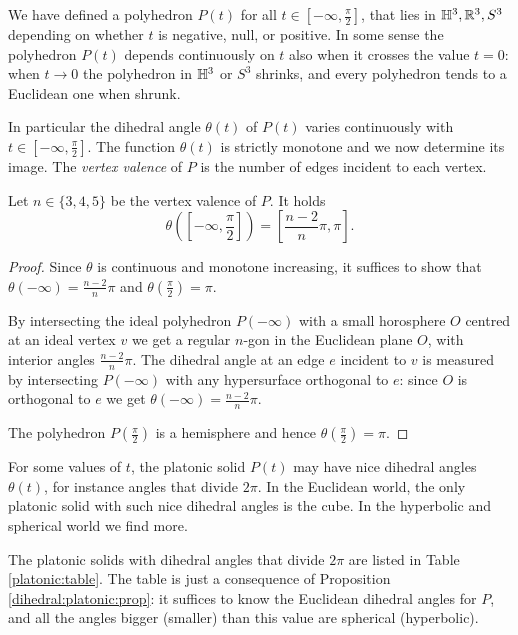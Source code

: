 We have defined a polyhedron $P(t)$ for all $t\in [-\infty, \frac \pi 2]$, that lies in $\mathbb{H}^3, \mathbb{R}^3, S^3$ depending on whether $t$ is negative, null, or positive. In some sense the polyhedron $P(t)$ depends continuously on $t$ also when it crosses the value $t=0$: when $t\to 0$ the polyhedron in $\mathbb{H}^3$ or $S^3$ shrinks, and every polyhedron tends to a Euclidean one when shrunk. 

In particular the dihedral angle $\theta(t)$ of $P(t)$ varies continuously with $t\in [-\infty, \frac \pi2]$. The function $\theta(t)$ is strictly monotone and we now determine its image. The \emph{vertex valence} of $P$ is the number of edges incident to each vertex.

\begin{prop} \label{dihedral:platonic:prop}
Let $n\in\{3,4,5\}$ be the vertex valence of $P$. It holds 
$$\theta \left(\left[-\infty, \frac \pi 2\right]\right) = \left[\frac{n-2}n \pi, \pi\right].$$
\end{prop}
\begin{proof}
Since $\theta$ is continuous and monotone increasing, it suffices to show that $\theta(-\infty) = \frac{n-2}n\pi$ and $\theta(\frac \pi 2) = \pi$.

By intersecting the ideal polyhedron $P(-\infty)$ with a small horosphere $O$ centred at an ideal vertex $v$ we get a regular $n$-gon in the Euclidean plane $O$, with interior angles $\frac{n-2}n\pi$. The dihedral angle at an edge $e$ incident to $v$ is measured by intersecting $P(-\infty)$ with any hypersurface orthogonal to $e$: since $O$ is orthogonal to $e$ we get $\theta(-\infty) =  \frac{n-2}n\pi$. 

The polyhedron $P(\frac \pi 2)$ is a hemisphere and hence $\theta(\frac \pi 2) = \pi$.
\end{proof}

For some values of $t$, the platonic solid $P(t)$ may have nice dihedral angles $\theta(t)$, for instance angles that divide $2\pi$. In the Euclidean world, the only platonic solid with such nice dihedral angles is the cube. In the hyperbolic and spherical world we find more.

The platonic solids with dihedral angles that divide $2\pi$ are listed in Table \ref{platonic:table}. The table is just a consequence of Proposition \ref{dihedral:platonic:prop}: it suffices to know the Euclidean dihedral angles for $P$, and all the angles bigger (smaller) than this value are spherical (hyperbolic).

